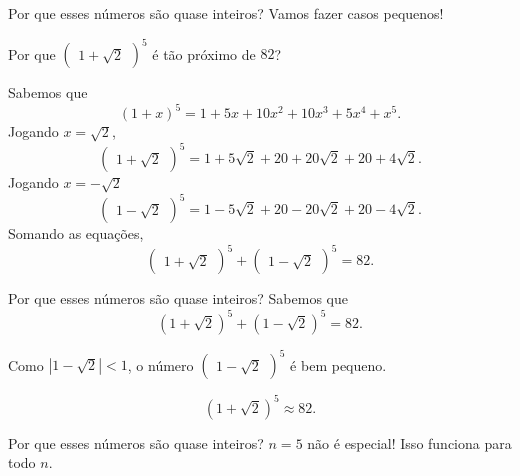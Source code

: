 \documentclass[aspectratio=169, handout]{beamer}
\begin{document}
\begin{frame}{Por que esses números são quase inteiros?}{}
	\pause Vamos fazer casos pequenos!

	\pause Por que $\begin{pmatrix}1+\sqrt{2}\end{pmatrix}^5$ é tão próximo de $82$?

	\pause Sabemos que
	\[
		\left(1+x\right)^5 = 1 + 5x + 10x^2 + 10x^3 + 5x^4 + x^5.
	\]
	\pause Jogando $x = \sqrt{2}$,\[
		\begin{pmatrix}1+\sqrt{2}\end{pmatrix}^5 = 1 + 5\sqrt{2} + 20 + 20\sqrt{2} + 20 + 4\sqrt{2}.
	\]
	\pause Jogando $x = -\sqrt{2}$ \[
		\begin{pmatrix}1-\sqrt{2}\end{pmatrix}^5 = 1 - 5\sqrt{2} + 20 - 20\sqrt{2} + 20 - 4\sqrt{2}.
	\]
	\pause Somando as equações,\[
		\begin{pmatrix}1+\sqrt{2}\end{pmatrix}^5 + \begin{pmatrix}1-\sqrt{2}\end{pmatrix}^5 = 82.
	\]
\end{frame}

\begin{frame}{Por que esses números são quase inteiros?}{}
	Sabemos que
	\[
		\left(1+\sqrt{2}\right)^5 + \left(1-\sqrt{2}\right)^5 = 82.
	\]

	\pause Como $\left| 1-\sqrt{2} \right| < 1$, o número $\begin{pmatrix}1-\sqrt{2}\end{pmatrix}^5$ é bem pequeno.

	\[
		\left(1+\sqrt{2}\right)^5 \approx 82.
	\]
\end{frame}

\begin{frame}[t]{Por que esses números são quase inteiros?}
	$n = 5$ não é especial! Isso funciona para todo $n$.

\end{frame}
\end{document}
